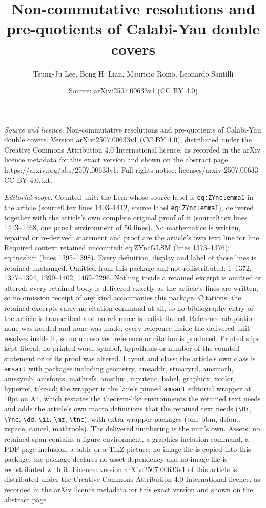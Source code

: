 \documentclass[10pt,a4paper]{amsart}
\title[Non-commutative resolutions and pre-quotients of Calabi-Yau ]{Non-commutative resolutions and pre-quotients of Calabi-Yau double covers}
\author{Tsung-Ju Lee, Bong H. Lian, Mauricio Romo, Leonardo Santilli}
\date{Source: arXiv:2507.00633v1 (CC BY 4.0)}
\begin{document}
\maketitle

\noindent\emph{Source and licence.} Non-commutative resolutions and pre-quotients of Calabi-Yau double covers. Version arXiv:2507.00633v1 (CC BY 4.0), distributed under the Creative Commons Attribution 4.0 International licence, as recorded in the arXiv licence metadata for this exact version and shown on the abstract page https://arxiv.org/abs/2507.00633v1. Full rights notice: licenses/arxiv-2507.00633-CC-BY-4.0.txt.\par\smallskip

\noindent\textit{Editorial scope.} Counted unit: the Lem whose source label is \texttt{eq:ZYnclemma1} in the article (source0.tex lines 1403--1412, source label \texttt{eq:ZYnclemma1}), delivered together with the article's own complete original proof of it (source0.tex lines 1413--1468, one \texttt{proof} environment of 56 lines). No mathematics is written, repaired or re-derived: statement and proof are the article's own text line for line. Required context retained uncounted: eq:ZYncGLSM (lines 1373--1376); eq:tncshift (lines 1395--1398). Every definition, display and label of those lines is retained unchanged. Omitted from this package and not redistributed: 1--1372, 1377--1394, 1399--1402, 1469--2296. Nothing inside a retained excerpt is omitted or altered: every retained body is delivered exactly as the article's lines are written, so no omission receipt of any kind accompanies this package. Citations: the retained excerpts carry no citation command at all, so no bibliography entry of the article is transcribed and no reference is redistributed. Reference adaptation: none was needed and none was made; every reference inside the delivered unit resolves inside it, so no unresolved reference or citation is produced. Printed slips kept literal: no printed word, symbol, hypothesis or number of the counted statement or of its proof was altered. Layout and class: the article's own class is \texttt{amsart} with packages including geometry, amsaddr, stmaryrd, amsmath, amssymb, amsfonts, mathrsfs, amsthm, inputenc, babel, graphicx, xcolor, hyperref, tikz-cd; the wrapper is the lane's pinned \texttt{amsart} editorial wrapper at 10pt on A4, which restates the theorem-like environments the retained text needs and adds the article's own macro definitions that the retained text needs (\texttt{\textbackslash Br}, \texttt{\textbackslash Ync}, \texttt{\textbackslash dd}, \texttt{\textbackslash ii}, \texttt{\textbackslash mz}, \texttt{\textbackslash tnc}), with extra wrapper packages (bm, bbm, dsfont, xspace, cancel, mathtools). The delivered numbering is the unit's own. Assets: no retained span contains a figure environment, a graphics-inclusion command, a PDF-page inclusion, a table or a TikZ picture; no image file is copied into this package, the package declares no asset dependency and no image file is redistributed with it. Licence: version arXiv:2507.00633v1 of this article is distributed under the Creative Commons Attribution 4.0 International licence, as recorded in the arXiv licence metadata for this exact version and shown on the abstract page 
\end{document}
